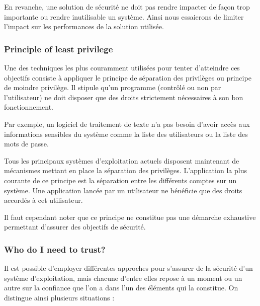 \documentclass[pdftex,a4paper,titlepage,11pt]{article}
\begin{document}
En revanche, une solution de sécurité ne doit pas rendre impacter de façon trop importante ou rendre inutilisable un système. Ainsi nous essaierons de limiter l'impact sur les performances de la solution utilisée.

\subsubsection{Principle of least privilege}

Une des techniques les plus couramment utilisées pour tenter d'atteindre ces objectifs consiste à appliquer le principe de séparation des privilèges ou principe de moindre privilège. Il stipule qu'un programme (contrôlé ou non par l'utilisateur) ne doit disposer que des droits strictement nécessaires à son bon fonctionnement.

Par exemple, un logiciel de traitement de texte n'a pas besoin d'avoir accès aux informations sensibles du système comme la liste des utilisateurs ou la liste des mots de passe.

Tous les principaux systèmes d'exploitation actuels disposent maintenant de mécanismes mettant en place la séparation des privilèges. L'application la plus courante de ce principe est la séparation entre les différents comptes sur un système. Une application lancée par un utilisateur ne bénéficie que des droits accordés à cet utilisateur.

Il faut cependant noter que ce principe ne constitue pas une démarche exhaustive permettant d'assurer des objectifs de sécurité.

\subsubsection{Who do I need to trust?}

Il est possible d'employer différentes approches pour s'assurer de la sécurité d'un système d'exploitation, mais chacune d'entre elles repose à un moment ou un autre sur la confiance que l'on a dans l'un des éléments qui la constitue. On distingue ainsi plusieurs situations \cite{WCS}:
\end{document}
